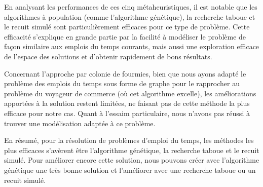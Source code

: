 
En analysant les performances de ces cinq métaheuristiques, il est notable que les algorithmes à population (comme l'algorithme génétique), la recherche taboue et le recuit simulé sont particulièrement efficaces pour ce type de problème.
Cette efficacité s'explique en grande partie par la facilité à modéliser le problème de façon similaire aux emplois du temps courants, mais aussi une exploration efficace de l'espace des solutions et d'obtenir rapidement de bons résultats.

Concernant l'approche par colonie de fourmies, bien que nous ayons adapté le problème des emplois du temps sous forme de graphe pour le rapprocher au problème du voyageur de commerce (où cet algorithme excelle), les améliorations apportées à la solution restent limitées, ne faisant pas de cette méthode la plus efficace pour notre cas.
Quant à l'essaim particulaire, nous n'avons pas réussi à trouver une modélisation adaptée à ce problème.

En résumé, pour la résolution de problèmes d'emploi du temps, les méthodes les plus efficaces s'avèrent être l'algorithme génétique, la recherche taboue et le recuit simulé.
Pour améliorer encore cette solution, nous pouvons créer avec l'algorithme génétique une très bonne solution et l'améliorer avec une recherche taboue ou un recuit simulé.